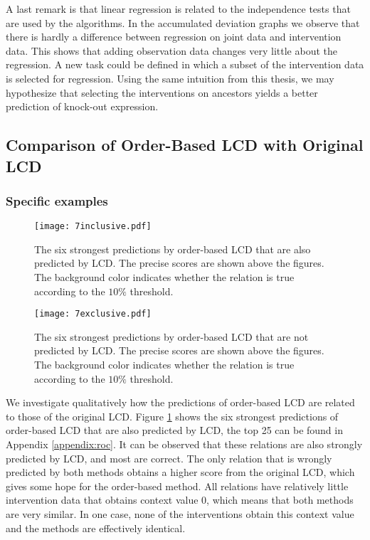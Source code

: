 A last remark is that linear regression is related to the independence tests that are used by the algorithms. In the accumulated deviation graphs we observe that there is hardly a difference between regression on joint data and intervention data. This shows that adding observation data changes very little about the regression. A new task could be defined in which a subset of the intervention data is selected for regression. Using the same intuition from this thesis, we may hypothesize that selecting the interventions on ancestors yields a better prediction of knock-out expression.



\subsection{Comparison of Order-Based LCD with Original LCD}

\subsubsection{Specific examples}


\begin{figure}[p]
    \centering
    \texttt{[image: 7inclusive.pdf]}
    \caption{The six strongest predictions by order-based LCD that are also predicted by LCD. The precise scores are shown above the figures. The background color indicates whether the relation is true according to the $10\%$ threshold.}
    \label{fig:7:exincl}
\end{figure}

\begin{figure}[p]
    \centering
    \texttt{[image: 7exclusive.pdf]}
    \caption{The six strongest predictions by order-based LCD that are not predicted by LCD. The precise scores are shown above the figures. The background color indicates whether the relation is true according to the $10\%$ threshold.}
    \label{fig:7:exexcl}
\end{figure}

We investigate qualitatively how the predictions of order-based LCD are related to those of the original LCD. Figure \ref{fig:7:exincl} shows the six strongest predictions of order-based LCD that are also predicted by LCD, the top 25 can be found in Appendix \ref{appendix:roc}. It can be observed that these relations are also strongly predicted by LCD, and most are correct. The only relation that is wrongly predicted by both methods obtains a higher score from the original LCD, which gives some hope for the order-based method. All relations have relatively little intervention data that obtains context value $0$, which means that both methods are very similar. In one case, none of the interventions obtain this context value and the methods are effectively identical. 

